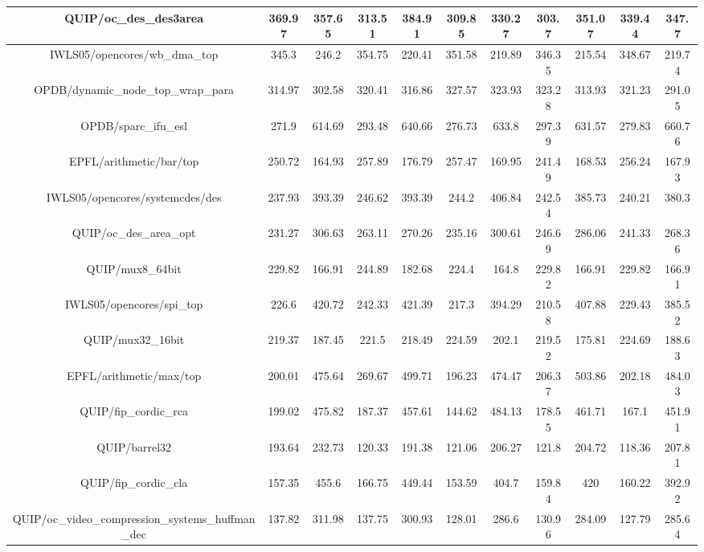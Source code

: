 {\begin{longtable}{|*{11}{c|}}
        \hline
        QUIP/oc\_des\_des3area & 369.97 & 357.65 & 313.51 & 384.91 & 309.85 & 330.27 & 303.7 & 351.07 & 339.44 & 347.7 \\
        \hline
        IWLS05/opencores/wb\_dma\_top & 345.3 & 246.2 & 354.75 & 220.41 & 351.58 & 219.89 & 346.35 & 215.54 & 348.67 & 219.74 \\
        \hline
        OPDB/dynamic\_node\_top\_wrap\_para & 314.97 & 302.58 & 320.41 & 316.86 & 327.57 & 323.93 & 323.28 & 313.93 & 321.23 & 291.05 \\
        \hline
        OPDB/sparc\_ifu\_esl & 271.9 & 614.69 & 293.48 & 640.66 & 276.73 & 633.8 & 297.39 & 631.57 & 279.83 & 660.76 \\
        \hline
        EPFL/arithmetic/bar/top & 250.72 & 164.93 & 257.89 & 176.79 & 257.47 & 169.95 & 241.49 & 168.53 & 256.24 & 167.93 \\
        \hline
        IWLS05/opencores/systemcdes/des & 237.93 & 393.39 & 246.62 & 393.39 & 244.2 & 406.84 & 242.54 & 385.73 & 240.21 & 380.3 \\
        \hline
        QUIP/oc\_des\_area\_opt & 231.27 & 306.63 & 263.11 & 270.26 & 235.16 & 300.61 & 246.69 & 286.06 & 241.33 & 268.36 \\
        \hline
        QUIP/mux8\_64bit & 229.82 & 166.91 & 244.89 & 182.68 & 224.4 & 164.8 & 229.82 & 166.91 & 229.82 & 166.91 \\
        \hline
        IWLS05/opencores/spi\_top & 226.6 & 420.72 & 242.33 & 421.39 & 217.3 & 394.29 & 210.58 & 407.88 & 229.43 & 385.52 \\
        \hline
        QUIP/mux32\_16bit & 219.37 & 187.45 & 221.5 & 218.49 & 224.59 & 202.1 & 219.52 & 175.81 & 224.69 & 188.63 \\
        \hline
        EPFL/arithmetic/max/top & 200.01 & 475.64 & 269.67 & 499.71 & 196.23 & 474.47 & 206.37 & 503.86 & 202.18 & 484.03 \\
        \hline
        QUIP/fip\_cordic\_rca & 199.02 & 475.82 & 187.37 & 457.61 & 144.62 & 484.13 & 178.55 & 461.71 & 167.1 & 451.91 \\
        \hline
        QUIP/barrel32 & 193.64 & 232.73 & 120.33 & 191.38 & 121.06 & 206.27 & 121.8 & 204.72 & 118.36 & 207.81 \\
        \hline
        QUIP/fip\_cordic\_cla & 157.35 & 455.6 & 166.75 & 449.44 & 153.59 & 404.7 & 159.84 & 420 & 160.22 & 392.92 \\
        \hline
        QUIP/oc\_video\_compression\_systems\_huffman\_dec & 137.82 & 311.98 & 137.75 & 300.93 & 128.01 & 286.6 & 130.96 & 284.09 & 127.79 & 285.64 \\

\end{longtable}}

